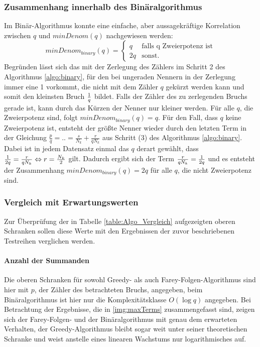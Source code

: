 \subsubsection{Zusammenhang innerhalb des Binäralgorithmus}\label{subsubsec:ZsmHangBinary}
Im Binär-Algorithmus konnte eine einfache, aber aussagekräftige Korrelation zwischen $q$ und $minDenom(q)$ nachgewiesen werden:
\begin{equation*}
	minDenom_{binary}(q) = 
	\begin{cases}
		q & \text{falls q Zweierpotenz ist} \\
		2q & \text{sonst.}
	\end{cases}
\end{equation*}
Begründen lässt sich das mit der Zerlegung des Zählers im Schritt 2 des Algorithmus \ref{algo:binary}, für den bei ungeraden Nennern in der Zerlegung immer eine 1 vorkommt, die nicht mit dem Zähler $q$ gekürzt werden kann und somit den kleinsten Bruch $\frac{1}{q}$ bildet. Falls der Zähler des zu zerlegenden Bruchs gerade ist, kann durch das Kürzen der Nenner nur kleiner werden. Für alle $q$, die Zweierpotenz sind, folgt $minDenom_{binary}(q) = q$. Für den Fall, dass $q$ keine Zweierpotenz ist, entsteht der größte Nenner wieder durch den letzten Term in der Gleichung $\frac{p}{q} = .. = \frac{s}{N_k}+\frac{r}{qN_k}$ aus Schritt (3) des Algorithmus \ref{algo:binary}. Dabei ist in jedem Datensatz einmal das $q$ derart gewählt, dass $\frac{1}{2q} = \frac{r}{qN_k} \Leftrightarrow r = \frac{N_k}{2}$ gilt. Dadurch ergibt sich der Term $\frac{r}{qN_k} = \frac{1}{2q}$ und es entsteht der Zusammenhang $minDenom_{binary}(q) = 2q$ für alle $q$, die nicht Zweierpotenz sind.

\subsubsection{Vergleich mit Erwartungswerten}
Zur Überprüfung der in Tabelle \ref{table:Algo_Vergleich} aufgezeigten oberen Schranken sollen diese Werte mit den Ergebnissen der zuvor beschriebenen Testreihen verglichen werden.

\paragraph{Anzahl der Summanden}Die oberen Schranken für sowohl Greedy- als auch Farey-Folgen-Al\-go\-rith\-mus sind hier mit $p$, der Zähler des betrachteten Bruchs, angegeben, beim Binäralgorithmus ist hier nur die Komplexitätsklasse $O(\log q)$ angegeben. Bei Betrachtung der Ergebnisse, die in \ref{img:maxTerms} zusammengefasst sind, zeigen sich der Farey-Folgen- und der Binäralgorithmus mit genau dem erwarteten Verhalten, der Greedy-Algorithmus bleibt sogar weit unter seiner theoretischen Schranke und weist anstelle eines linearen Wachstums nur logarithmisches auf.
